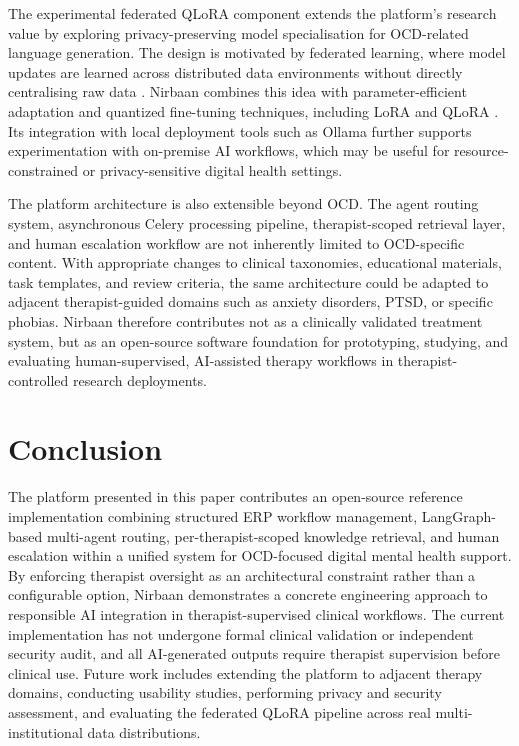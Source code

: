 \documentclass[preprint,12pt,a4paper]{elsarticle}
\begin{document}
The experimental federated QLoRA component extends the platform's research value by exploring privacy-preserving model specialisation for OCD-related language generation. The design is motivated by federated learning, where model updates are learned across distributed data environments without directly centralising raw data \cite{mcmahan2017federated}. Nirbaan combines this idea with parameter-efficient adaptation and quantized fine-tuning techniques, including LoRA and QLoRA \cite{hu2021lora, dettmers2023qlora}. Its integration with local deployment tools such as Ollama further supports experimentation with on-premise AI workflows, which may be useful for resource-constrained or privacy-sensitive digital health settings.

The platform architecture is also extensible beyond OCD. The agent routing system, asynchronous Celery processing pipeline, therapist-scoped retrieval layer, and human escalation workflow are not inherently limited to OCD-specific content. With appropriate changes to clinical taxonomies, educational materials, task templates, and review criteria, the same architecture could be adapted to adjacent therapist-guided domains such as anxiety disorders, PTSD, or specific phobias. Nirbaan therefore contributes not as a clinically validated treatment system, but as an open-source software foundation for prototyping, studying, and evaluating human-supervised, AI-assisted therapy workflows in therapist-controlled research deployments.

\section{Conclusion}

The platform presented in this paper contributes an open-source reference implementation combining structured ERP workflow management, LangGraph-based multi-agent routing, per-therapist-scoped knowledge retrieval, and human escalation within a unified system for OCD-focused digital mental health support. By enforcing therapist oversight as an architectural constraint rather than a configurable option, Nirbaan demonstrates a concrete engineering approach to responsible AI integration in therapist-supervised clinical workflows. The current implementation has not undergone formal clinical validation or independent security audit, and all AI-generated outputs require therapist supervision before clinical use. Future work includes extending the platform to adjacent therapy domains, conducting usability studies, performing privacy and security assessment, and evaluating the federated QLoRA pipeline across real multi-institutional data distributions.
\end{document}
